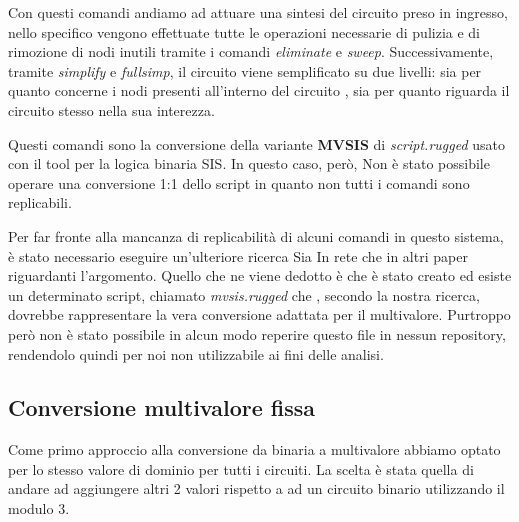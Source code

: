 \documentclass[
  italian,
]{book}
\begin{document}
Con questi comandi andiamo ad attuare una sintesi del circuito preso in ingresso, nello specifico vengono effettuate tutte le operazioni necessarie di pulizia e di rimozione di nodi inutili tramite i comandi \emph{eliminate} e \emph{sweep}. Successivamente, tramite \emph{simplify} e \emph{fullsimp}, il circuito viene semplificato su due livelli: sia per quanto concerne i nodi presenti all'interno del circuito , sia per quanto riguarda il circuito stesso nella sua interezza.

Questi comandi sono la conversione della variante \textbf{MVSIS} di \emph{script.rugged} usato con il tool per la logica binaria SIS. In questo caso, però, Non è stato possibile operare una conversione 1:1 dello script in quanto non tutti i comandi sono replicabili.

Per far fronte alla mancanza di replicabilità di alcuni comandi in questo sistema, è stato necessario eseguire un'ulteriore ricerca Sia In rete che in altri paper riguardanti l'argomento. Quello che ne viene dedotto è che è stato creato ed esiste un determinato script, chiamato \emph{mvsis.rugged} che , secondo la nostra ricerca, dovrebbe rappresentare la vera conversione adattata per il multivalore. Purtroppo però non è stato possibile in alcun modo reperire questo file in nessun repository, rendendolo quindi per noi non utilizzabile ai fini delle analisi.

\newpage

\hypertarget{conversione-multivalore-fissa}{%
\subsection{Conversione multivalore fissa}\label{conversione-multivalore-fissa}}

Come primo approccio alla conversione da binaria a multivalore abbiamo optato per lo stesso valore di dominio per tutti i circuiti. La scelta è stata quella di andare ad aggiungere altri 2 valori rispetto a ad un circuito binario utilizzando il modulo 3.
\end{document}

